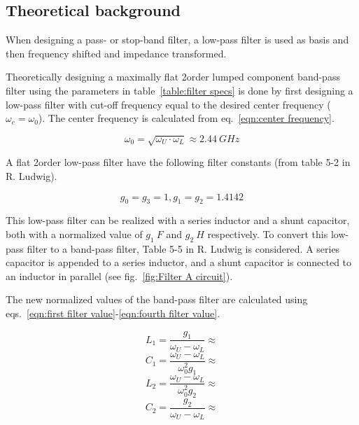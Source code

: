 \documentclass[report.tex]{subfiles}
\begin{document}
\subsection{Theoretical background}
When designing a pass- or stop-band filter, a low-pass filter is used as basis and then frequency shifted and impedance transformed. 

Theoretically designing a maximally flat 2\nd order lumped component band-pass filter using the parameters in table~\ref{table:filter specs} is done by first designing a low-pass filter with cut-off frequency equal to the desired center frequency ($\omega_c=\omega_0$). The center frequency is calculated from eq.~\ref{eqn:center frequency}.

\begin{equation}
    \omega_0 = \sqrt{\omega_U \cdot \omega_L} \approx 2.44~GHz
    \label{eqn:center frequency}
\end{equation}

A flat 2\nd order low-pass filter have the following filter constants (from table 5-2 in R. Ludwig).

\begin{equation*}
    g_0=g_3=1, g_1=g_2=1.4142
\end{equation*}

This low-pass filter can be realized with a series inductor and a shunt capacitor, both with a normalized value of $g_1~F$ and $g_2~H$ respectively. To convert this low-pass filter to a band-pass filter, Table 5-5 in R. Ludwig is considered. A series capacitor is appended to a series inductor, and a shunt capacitor is connected to an inductor in parallel (see fig.~\ref{fig:Filter A circuit}).

The new normalized values of the band-pass filter are calculated using eqs.~\ref{eqn:first filter value}-\ref{eqn:fourth filter value}.

\begin{equation}
    \label{eqn:first filter value}
    L_1=\frac{g_1}{\omega_U-\omega_L} \approx 
\end{equation}
\begin{equation}
    C_1=\frac{\omega_U-\omega_L}{\omega_0^2 g_1} \approx
\end{equation}
\begin{equation}
    L_2=\frac{\omega_U-\omega_L}{\omega_0^2 g_2} \approx
\end{equation}
\begin{equation}
    \label{eqn:fourth filter value}
    C_2=\frac{g_2}{\omega_U-\omega_L} \approx
\end{equation}
\end{document}

